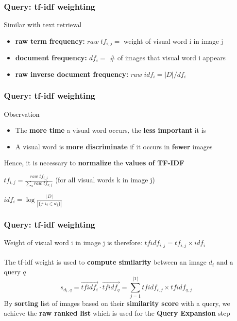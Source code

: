 \begin{frame}
    \frametitle{Query: tf-idf weighting}
    Similar with text retrieval
    \begin{itemize}
        \item \textbf{raw term frequency:} $raw\;tf_{i,j} =$ weight of visual word i in image j
        \item \textbf{document frequency:} $df_i =$ \# of images that visual word i appears
        \item \textbf{raw inverse document frequency:} $raw\;idf_i = |D|/df_i$
    \end{itemize}   
\end{frame}

\begin{frame}
    \frametitle{Query: tf-idf weighting}
    Observation
    \begin{itemize}
        \item The \textbf{more time} a visual word occurs, the \textbf{less important} it is
        \item A visual word is \textbf{more discriminate} if it occurs in \textbf{fewer} images
    \end{itemize}
    Hence, it is necessary to \textbf{normalize} the \textbf{values of TF-IDF}
    
    \hspace{4ex}$tf_{i,j} =  \frac{raw\;tf_{i,j}}{\sum\limits_{k}raw\;tf_{k,j}}$ (for all visual words k in image j)
    
    \hspace{4ex}$idf_{i} = \log{\frac{|D|}{|\{j:t_{i}\in d_{j}\}|}}$
\end{frame}

\begin{frame}
    \frametitle{Query: tf-idf weighting}
    Weight of visual word i in image j is therefore: $tfidf_{i,j} = tf_{i,j}\times idf_{i}$\\\\
    The tf-idf weight is used to \textbf{compute similarity} between an image $d_{i}$ and a query $q$
    \begin{equation*}
        s_{d_{i},q} = \vec{{tfidf}_{i}} \cdot \vec{{tfidf}_{q}} = \sum\limits_{j = 1}^{\left|T\right|} {tfidf}_{i, j} \times {tfidf}_{q, j}
    \end{equation*}
    By \textbf{sorting} list of images based on their \textbf{similarity score} with a query, we achieve the \textbf{raw ranked list} which is used for the \textbf{Query Expansion} step
\end{frame}

